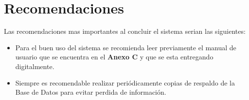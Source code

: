 \section{Recomendaciones}
Las recomendaciones mas importantes al concluir el sistema serian las siguientes:

\begin{itemize}
    \item Para el buen uso del sistema se recomienda leer previamente el manual
      de usuario que se encuentra en el {\bfseries Anexo C} y que se esta entregando digitalmente.
    \item Siempre es recomendable realizar periódicamente copias de respaldo de
      la Base de Datos para evitar perdida de información.
\end{itemize}
